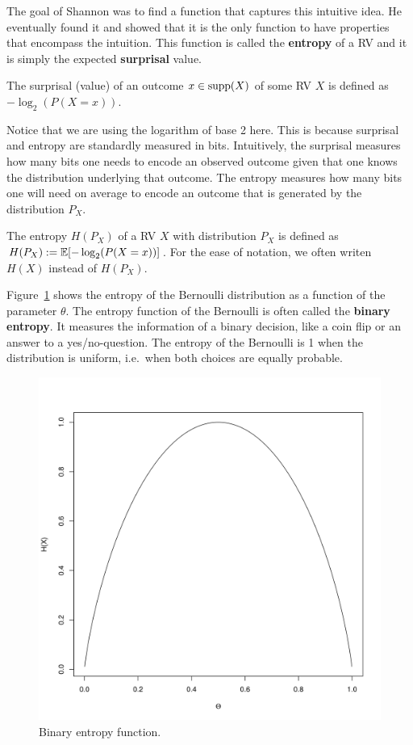 The goal of Shannon was to find a function that captures this intuitive idea. He eventually found it and showed that it is the only function to have properties
that encompass the intuition. This function is called the \textbf{entropy} of a RV and it is simply the expected \textbf{surprisal} value.

\begin{Definition}[Surprisal]
The surprisal (value) of an outcome $ x \in \operatorname{supp}(X) $ of some RV $ X $ is defined as $ -\log_{2}(P(X=x))$.
\end{Definition} 

Notice that we are using the logarithm of base 2 here. This is because surprisal and entropy are standardly measured in bits. Intuitively, the surprisal measures
how many bits one needs to encode an observed outcome given that one knows the distribution underlying that outcome. The entropy measures how many bits one
will need on average to encode an outcome that is generated by the distribution $ P_{X} $.

\begin{Definition}[Entropy]
The entropy $H(P_X)$ of a RV $ X $ with distribution $P_X$ is defined as $H(P_X) := \mathbb{E}[-\log_{2}(P(X=x))]$. For the ease of notation, we often writen $H(X)$ instead of $H(P_X)$.
\end{Definition}

Figure~\ref{fig:binaryEntropy} shows the entropy of the Bernoulli distribution as a function of the
parameter $ \theta $. The entropy function of the Bernoulli is often called the \textbf{binary entropy}.
It measures the information of a binary decision, like a coin flip or an answer to a yes/no-question.
The entropy of the Bernoulli is 1 when the distribution is uniform, i.e.\ when both choices are equally 
probable. 

\begin{figure}
\center
\includegraphics[scale=0.4]{binaryEntropy.png}
\caption{Binary entropy function.}
\label{fig:binaryEntropy}
\end{figure}

